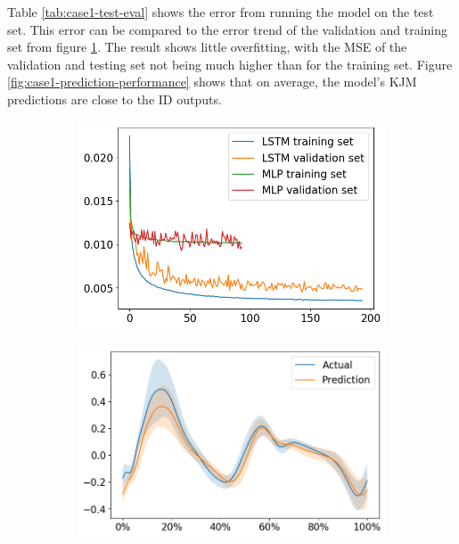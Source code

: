 \documentclass[../main.tex]{subfiles}
\begin{document}
Table \ref{tab:case1-test-eval} shows the error from running the model on the test set.
This error can be compared to the error trend of the validation and training set from figure \ref{fig:case1-training-performance}.
The result shows little overfitting, with the \ac{MSE} of the validation and testing set not being much higher than for the training set.
Figure \ref{fig:case1-prediction-performance} shows that on average, the model's \ac{KJM} predictions are close to the \ac{ID} outputs.

\begin{figure}[!htb]
     \centering
     \begin{subfigure}[b]{0.475\textwidth}
         \centering
         \includegraphics[width=\textwidth]{img/results/training_history/Case1_LSTMvsMLP_training.png}
         \label{fig:case1-training-performance}
     \end{subfigure}
     \hfill
     \begin{subfigure}[b]{0.515\textwidth}
         \centering
         \includegraphics[width=\textwidth]{img/results/test_prediction_evaluation/Case1_LSTM_test_prediction.png}

\end{subfigure}
\end{figure}
\end{document}
